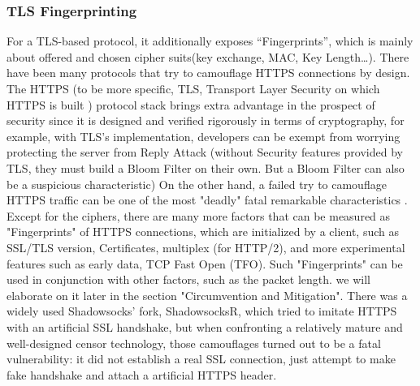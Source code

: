 \documentclass[conference]{IEEEtran}
\begin{document}
\begin{table}[h]
\centering
\caption{Average Entropy for Common Protocols}
\end{table}

\subsubsection{TLS Fingerprinting}
For a TLS-based protocol, it additionally exposes “Fingerprints”, which is mainly about offered and chosen cipher suits(key exchange, MAC, Key Length…). There have been many protocols that try to camouflage HTTPS connections by design.
The HTTPS (to be more specific, TLS, Transport Layer Security on which HTTPS is built ) protocol stack brings extra advantage in the prospect of security since it is designed and verified rigorously in terms of cryptography, for example, with TLS's implementation, developers can be exempt from worrying protecting the server from Reply Attack (without Security features provided by TLS, they must build a Bloom Filter on their own. But a Bloom Filter can also be a suspicious characteristic)
On the other hand, a failed try to camouflage HTTPS traffic can be one of the most "deadly" fatal remarkable characteristics \cite{TLS_Fingerprinting}. Except for the ciphers, there are many more factors that can be measured as "Fingerprints" of HTTPS connections, which are initialized by a client, such as SSL/TLS version, Certificates, multiplex (for HTTP/2), and more experimental features such as early data, TCP Fast Open (TFO). Such "Fingerprints" can be used in conjunction with other factors, such as the packet length. we will elaborate on it later in the section "Circumvention and Mitigation".
There was a widely used Shadowsocks’ fork, ShadowsocksR, which tried to imitate HTTPS with an artificial SSL handshake, but when confronting a relatively mature and well-designed censor technology, those camouflages turned out to be a fatal vulnerability: it did not establish a real SSL connection, just attempt to make fake handshake and attach a artificial HTTPS header.
\end{document}
